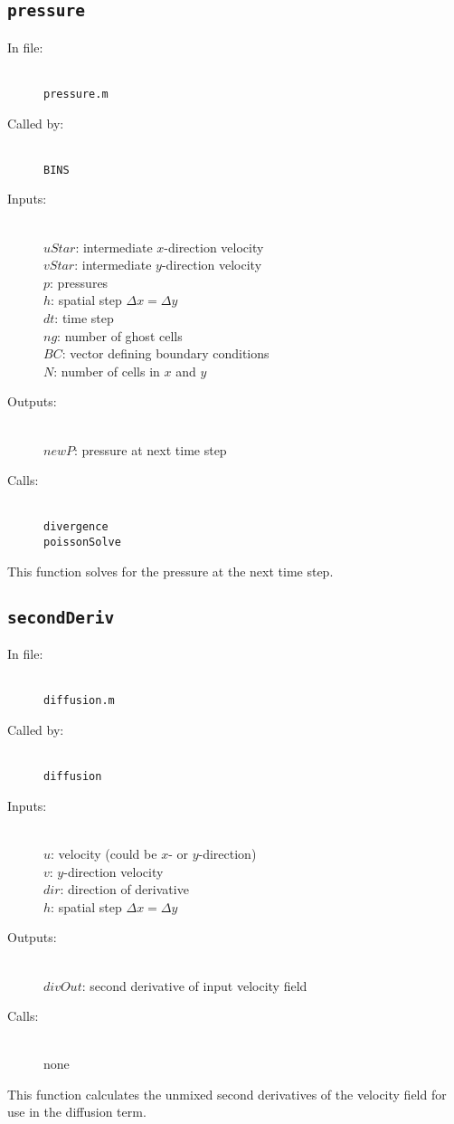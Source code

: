 \documentclass[12pt]{article}
\begin{document}
\subsection{\texttt{pressure}}
\begin{description}
\item[In file:] \hfill \\ \texttt{pressure.m}
\item[Called by:] \hfill \\ \texttt{BINS}
\item[Inputs:] \hfill \\ $uStar$: intermediate $x$-direction velocity \\ $vStar$: intermediate $y$-direction velocity \\ $p$: pressures \\ $h$: spatial step $\Delta x = \Delta y$ \\ $dt$: time step \\ $ng$: number of ghost cells \\ $BC$: vector defining boundary conditions \\ $N$: number of cells in $x$ and $y$
\item[Outputs:] \hfill \\ $newP$: pressure at next time step
\item[Calls:] \hfill \\ \texttt{divergence} \\ \texttt{poissonSolve}
\end{description}
This function solves for the pressure at the next time step.

\subsection{\texttt{secondDeriv}}
\begin{description}
\item[In file:] \hfill \\ \texttt{diffusion.m}
\item[Called by:] \hfill \\ \texttt{diffusion}
\item[Inputs:] \hfill \\ $u$: velocity (could be $x$- or $y$-direction) \\ $v$: $y$-direction velocity \\ $dir$: direction of derivative  \\ $h$: spatial step $\Delta x = \Delta y$ 
\item[Outputs:] \hfill \\ $divOut$: second derivative of input velocity field
\item[Calls:] \hfill \\ none
\end{description}
This function calculates the unmixed second derivatives of the velocity field for use in the diffusion term.
\end{document}
